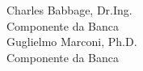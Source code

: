 


Charles Babbage, Dr.Ing.\\%
Componente da Banca\\%
Guglielmo Marconi, Ph.D. \\%
Componente da Banca
